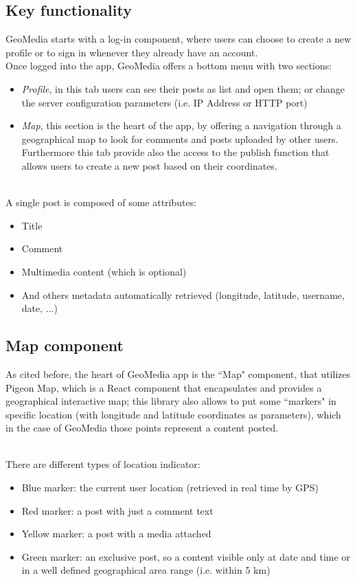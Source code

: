 \documentclass[conference]{IEEEtran}
\begin{document}
\subsection{Key functionality }

GeoMedia starts with a log-in component, where users can choose to create a new profile or to sign in whenever they already have an account.
\\
Once logged into the app, GeoMedia offers a bottom menu with two sections: 
\begin{itemize}
    \item \textit{Profile}, in this tab users can see their posts as list and open them; or change the server configuration parameters (i.e. IP Address or HTTP port)
    \item  \textit{Map}, this section is the heart of the app, by offering a navigation through a geographical map to look for comments and posts uploaded by other users. Furthermore this tab provide also the access to the publish function that allows users to create a new post based on their coordinates.
\end{itemize}

\\
A single post is composed of some attributes:
\begin{itemize}
    \item Title
    \item Comment
    \item Multimedia content (which is optional)
    \item And others metadata automatically retrieved (longitude, latitude, username, date, ...)
\end{itemize}

\subsection{Map component}

As cited before, the heart of GeoMedia app is the ``Map" component, that utilizes Pigeon Map\cite{b8}, which is a React component that encapsulates and provides a geographical interactive map; this library also allows to put some ``markers" in specific location (with longitude and latitude coordinates as parameters), which in the case of GeoMedia those points represent a content posted.

\\

There are different types of location indicator:
\begin{itemize}
\item Blue marker: the current user location (retrieved in real time by GPS)
\item Red marker: a post with just a comment text
\item Yellow marker: a post with a media attached
\item Green marker: an exclusive post, so a content visible only at date and time or in a well defined geographical area range (i.e. within 5 km)
\end{itemize}
\end{document}
